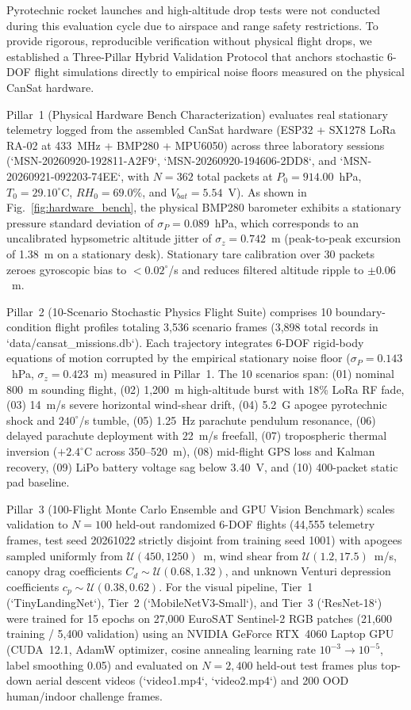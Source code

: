 \documentclass[conference]{IEEEtran}
\begin{document}
Pyrotechnic rocket launches and high-altitude drop tests were not conducted during this evaluation cycle due to airspace and range safety restrictions. To provide rigorous, reproducible verification without physical flight drops, we established a Three-Pillar Hybrid Validation Protocol that anchors stochastic 6-DOF flight simulations directly to empirical noise floors measured on the physical CanSat hardware.

Pillar~1 (Physical Hardware Bench Characterization) evaluates real stationary telemetry logged from the assembled CanSat hardware (ESP32 + SX1278 LoRa RA-02 at 433~MHz + BMP280 + MPU6050) across three laboratory sessions (`MSN-20260920-192811-A2F9`, `MSN-20260920-194606-2DD8`, and `MSN-20260921-092203-74EE`, with $N = 362$ total packets at $P_0 = 914.00$~hPa, $T_0 = 29.10^\circ$C, $RH_0 = 69.0\%$, and $V_{bat} = 5.54$~V). As shown in Fig.~\ref{fig:hardware_bench}, the physical BMP280 barometer exhibits a stationary pressure standard deviation of $\sigma_P = 0.089$~hPa, which corresponds to an uncalibrated hypsometric altitude jitter of $\sigma_z = 0.742$~m (peak-to-peak excursion of 1.38~m on a stationary desk). Stationary tare calibration over 30 packets zeroes gyroscopic bias to $<0.02^\circ$/s and reduces filtered altitude ripple to $\pm 0.06$~m.

Pillar~2 (10-Scenario Stochastic Physics Flight Suite) comprises 10 boundary-condition flight profiles totaling 3,536 scenario frames (3,898 total records in `data/cansat_missions.db`). Each trajectory integrates 6-DOF rigid-body equations of motion corrupted by the empirical stationary noise floor ($\sigma_P = 0.143$~hPa, $\sigma_z = 0.423$~m) measured in Pillar~1. The 10 scenarios span: (01) nominal 800~m sounding flight, (02) 1,200~m high-altitude burst with 18\% LoRa RF fade, (03) 14~m/s severe horizontal wind-shear drift, (04) 5.2~G apogee pyrotechnic shock and $240^\circ$/s tumble, (05) 1.25~Hz parachute pendulum resonance, (06) delayed parachute deployment with 22~m/s freefall, (07) tropospheric thermal inversion ($+2.4^\circ$C across 350--520~m), (08) mid-flight GPS loss and Kalman recovery, (09) LiPo battery voltage sag below 3.40~V, and (10) 400-packet static pad baseline.

Pillar~3 (100-Flight Monte Carlo Ensemble and GPU Vision Benchmark) scales validation to $N = 100$ held-out randomized 6-DOF flights (44,555 telemetry frames, test seed 20261022 strictly disjoint from training seed 1001) with apogees sampled uniformly from $\mathcal{U}(450, 1250)$~m, wind shear from $\mathcal{U}(1.2, 17.5)$~m/s, canopy drag coefficients $C_d \sim \mathcal{U}(0.68, 1.32)$, and unknown Venturi depression coefficients $c_p \sim \mathcal{U}(0.38, 0.62)$. For the visual pipeline, Tier~1 (`TinyLandingNet`), Tier~2 (`MobileNetV3-Small`), and Tier~3 (`ResNet-18`) were trained for 15 epochs on 27,000 EuroSAT Sentinel-2 RGB patches (21,600 training / 5,400 validation) using an NVIDIA GeForce RTX~4060 Laptop GPU (CUDA~12.1, AdamW optimizer, cosine annealing learning rate $10^{-3} \rightarrow 10^{-5}$, label smoothing 0.05) and evaluated on $N = 2,400$ held-out test frames plus top-down aerial descent videos (`video1.mp4`, `video2.mp4`) and 200 OOD human/indoor challenge frames.
\end{document}

